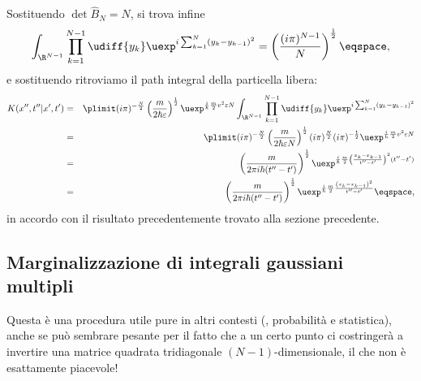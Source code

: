 Sostituendo $\det\hat{B}_{N} = N$, si trova infine
\begin{displaymath}
\int_{\R^{N-1}} \prod_{k=1}^{N-1} \udiff{y_{k}} \uexp^{ i \sum_{k=1}^{N} \left(
y_{k} - y_{k-1} \right)^{2}} = \left( \frac{(i\pi)^{N-1}}{N}
\right)^{\frac{1}{2}} \eqspace, 
\end{displaymath}
e sostituendo ritroviamo il path integral della particella libera:
\begin{eqnarray*}
K(x'', t'' | x', t')
&=& \plimit (i \pi)^{-\frac{N}{2}}  \left( \frac{m}{2\hbar \varepsilon}
\right)^{\frac{1}{2}} \uexp^{ \frac{i}{\hbar} \frac{m}{2} v^{2} \varepsilon N}
\int_{\R^{N-1}} \prod_{k=1}^{N-1} \udiff{y_{k}} \uexp^{ i \sum_{k=1}^{N} \left(
y_{k} - y_{k-1}\right)^{2}} \\
&=&
\plimit (i\pi)^{-\frac{N}{2}} \left( \frac{m}{2\hbar\varepsilon N}
\right)^{\frac{1}{2}} (i\pi)^{\frac{N}{2}} (i\pi)^{-\frac{1}{2}}  \uexp^{
\frac{i}{\hbar}  \frac{m}{2} v^{2} \varepsilon N}  \\
&=& \left( \frac{m}{2\pi i \hbar (t'' - t')} \right)^{\frac{1}{2}} 
\uexp^{ \frac{i}{\hbar} \frac{m}{2} \left( \frac{x_{k} - x_{k-1}}{t''-t'}
\right)^{2} (t''-t') } \\
&=& \left( \frac{m}{2\pi i \hbar (t'' - t')} \right)^{\frac{1}{2}} 
\uexp^{ \frac{i}{\hbar} \frac{m}{2} \frac{\left( x_{k} -
x_{k-1}\right)^{2}}{t''-t'}} \eqspace,
\end{eqnarray*}
in accordo con il risultato precedentemente trovato alla sezione precedente.



\subsection{Marginalizzazione di integrali gaussiani
multipli\label{sec:marginalizzazione}}

Questa \`e una procedura utile pure in altri contesti (\eg, probabilit\`a  e
statistica), anche se pu\`o sembrare pesante per il fatto che a un certo punto ci
costringer\`a a invertire una matrice quadrata tridiagonale
$(N-1)$-dimensionale, il che non \`e esattamente piacevole! 




